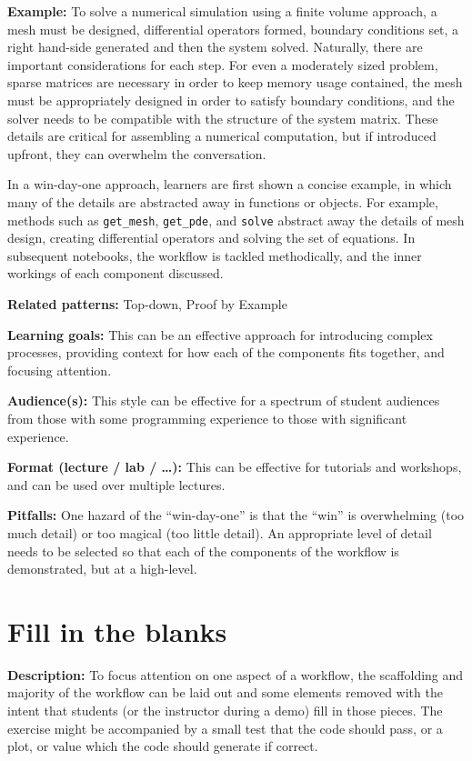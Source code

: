 \documentclass[]{book}
\begin{document}
\textbf{Example:} To solve a numerical simulation using a finite volume
approach, a mesh must be designed, differential operators formed,
boundary conditions set, a right hand-side generated and then the system
solved. Naturally, there are important considerations for each step. For
even a moderately sized problem, sparse matrices are necessary in order
to keep memory usage contained, the mesh must be appropriately designed
in order to satisfy boundary conditions, and the solver needs to be
compatible with the structure of the system matrix. These details are
critical for assembling a numerical computation, but if introduced
upfront, they can overwhelm the conversation.

In a win-day-one approach, learners are first shown a concise example,
in which many of the details are abstracted away in functions or
objects. For example, methods such as \texttt{get\_mesh},
\texttt{get\_pde}, and \texttt{solve} abstract away the details of mesh
design, creating differential operators and solving the set of
equations. In subsequent notebooks, the workflow is tackled
methodically, and the inner workings of each component discussed.

\textbf{Related patterns:} Top-down, Proof by Example

\textbf{Learning goals:} This can be an effective approach for
introducing complex processes, providing context for how each of the
components fits together, and focusing attention.

\textbf{Audience(s):} This style can be effective for a spectrum of
student audiences from those with some programming experience to those
with significant experience.

\textbf{Format (lecture / lab / \ldots{}):} This can be effective for
tutorials and workshops, and can be used over multiple lectures.

\textbf{Pitfalls:} One hazard of the ``win-day-one'' is that the ``win''
is overwhelming (too much detail) or too magical (too little detail). An
appropriate level of detail needs to be selected so that each of the
components of the workflow is demonstrated, but at a high-level.

\section{Fill in the blanks}\label{fill-in-the-blanks}

\textbf{Description:} To focus attention on one aspect of a workflow,
the scaffolding and majority of the workflow can be laid out and some
elements removed with the intent that students (or the instructor during
a demo) fill in those pieces. The exercise might be accompanied by a
small test that the code should pass, or a plot, or value which the code
should generate if correct.
\end{document}
